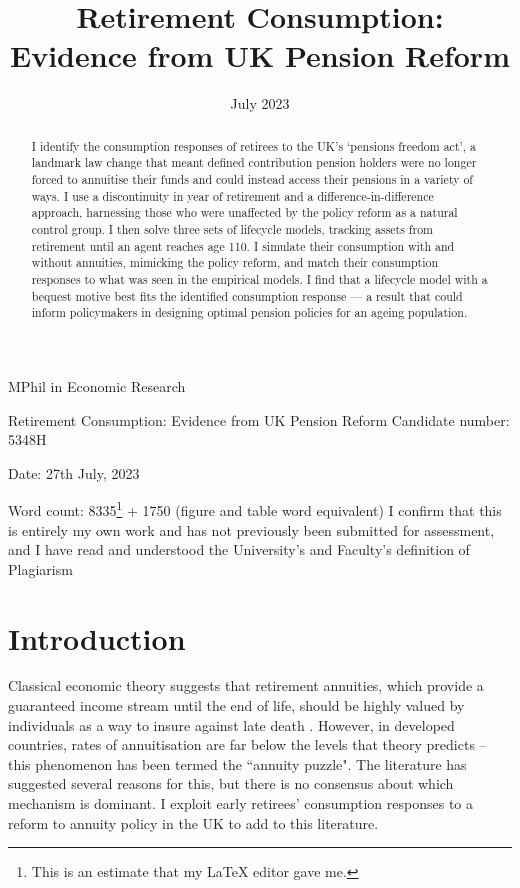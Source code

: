 \documentclass[12pt]{article}
\date{July 2023}
\title{Retirement Consumption: Evidence from UK Pension Reform}
\begin{document}
\begin{titlepage}
    \begin{center}

        \normalsize
        {MPhil in Economic Research}
        \vfill

        \huge
        Retirement Consumption: Evidence from UK Pension Reform
        \vfill
        \normalsize
        Candidate number: 5348H

        Date: 27th July, 2023

        Word count: 8335\footnote{This is an estimate that my LaTeX editor gave me.} + 1750 (figure and table word equivalent)
        \vfill
        I confirm that this is entirely my own work and has not previously been submitted for assessment, and I have read and understood the University’s and Faculty’s definition of Plagiarism
    \end{center}
\end{titlepage}
\newpage
\maketitle
\begin{abstract}
    I identify the consumption responses of retirees to the UK's `pensions
    freedom act', a landmark law change that meant defined contribution pension
    holders were no longer forced to annuitise their funds and could instead
    access their pensions in a variety of ways. I use a discontinuity in year of
    retirement and a difference-in-difference approach, harnessing those who
    were unaffected by the policy reform as a natural control group. I then
    solve three sets of lifecycle models, tracking assets from retirement until an
    agent reaches age 110. I simulate their consumption with and without
    annuities, mimicking the policy reform, and match their consumption
    responses to what was seen in the empirical models. I find that a lifecycle
    model with a bequest motive best fits the identified consumption response —
    a result that could inform policymakers in designing optimal pension
    policies for an ageing population.
\end{abstract}
\newpage
\tableofcontents
\newpage

\section{Introduction}
Classical economic theory suggests that retirement annuities, which provide a
guaranteed income stream until the end of life, should be highly valued by
individuals as a way to insure against late death \citep{yaari_65}. However, in
developed countries, rates of annuitisation are far below the levels that theory
predicts -- this phenomenon has been termed the ``annuity puzzle". The literature
has suggested several reasons for this, but there is no consensus about which
mechanism is dominant. I exploit early retirees' consumption responses to a
reform to annuity policy in the UK to add to this literature.
\end{document}
